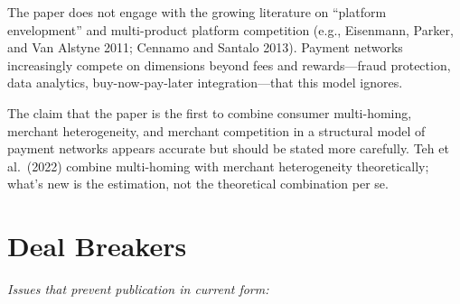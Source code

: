 \documentclass[11pt]{article}
\begin{document}
The paper does not engage with the growing literature on ``platform envelopment'' and multi-product platform competition (e.g., Eisenmann, Parker, and Van Alstyne 2011; Cennamo and Santalo 2013). Payment networks increasingly compete on dimensions beyond fees and rewards---fraud protection, data analytics, buy-now-pay-later integration---that this model ignores.

The claim that the paper is the first to combine consumer multi-homing, merchant heterogeneity, and merchant competition in a structural model of payment networks appears accurate but should be stated more carefully. Teh et al.\ (2022) combine multi-homing with merchant heterogeneity theoretically; what's new is the estimation, not the theoretical combination per se.

\section{Deal Breakers}

\textit{Issues that prevent publication in current form:}
\end{document}
